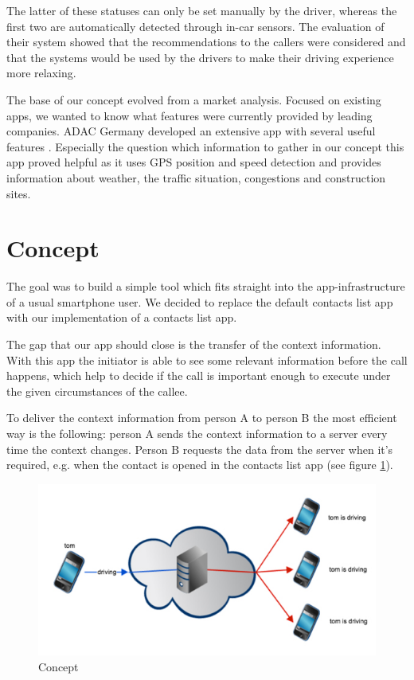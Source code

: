 \documentclass{sigchi}
\begin{document}
 The latter of these statuses can only be set manually by the driver, whereas the first two are automatically detected through in-car sensors. The evaluation of their system showed that the recommendations to the callers were considered and that the systems would be used by the drivers to make their driving experience more relaxing.
 
The base of our concept evolved from a market analysis. Focused on existing apps, we wanted to know  what features were currently provided by leading companies. \cite{aaa} \cite{glympse}
ADAC Germany developed an extensive app with several useful features \cite{adac}. Especially the question which information to gather in our concept this app proved helpful as it uses GPS position and speed detection and provides information about weather, the traffic situation, congestions and construction sites.





\section{Concept}
The goal was to build a simple tool which fits straight into the app-infrastructure of a usual smartphone user. We decided to replace the default contacts list app with our implementation of a contacts list app.

The gap that our app should close is the transfer of the context information. With this app the initiator is able to see some relevant information before the call happens, which help to decide if the call is important enough to execute under the given circumstances of the callee.

To deliver the context information from person A to person B the most efficient way is the following:
person A sends the context information to a server every time the context changes. Person B requests the data from the server when it's required, e.g. when the contact is opened in the contacts list app (see figure \ref{fig:app_concept}).

\begin{figure}[H]
	\centering
		\includegraphics[width=.95\linewidth]{figures/concept}
		\caption{Concept}
	\label{fig:app_concept}
\end{figure}
\end{document}
